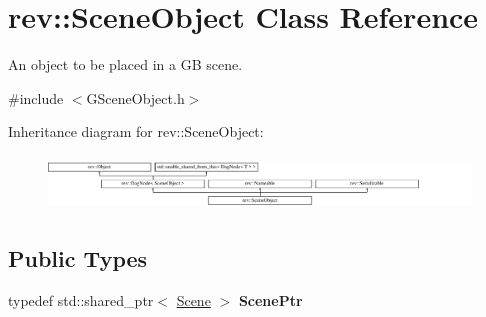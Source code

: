 \hypertarget{classrev_1_1_scene_object}{}\section{rev\+::Scene\+Object Class Reference}
\label{classrev_1_1_scene_object}


An object to be placed in a GB scene.  




{\ttfamily \#include $<$G\+Scene\+Object.\+h$>$}

Inheritance diagram for rev\+::Scene\+Object\+:\begin{figure}[H]
\begin{center}
\leavevmode
\includegraphics[height=1.438356cm]{classrev_1_1_scene_object}
\end{center}
\end{figure}
\subsection*{Public Types}
\begin{DoxyCompactItemize}
\item 
\mbox{\label{classrev_1_1_scene_object_a08a443f7f51adc2c2a70d396ef3031ae}} 
typedef std\+::shared\+\_\+ptr$<$ \mbox{\hyperlink{classrev_1_1_scene}{Scene}} $>$ {\bfseries Scene\+Ptr}
\end{DoxyCompactItemize}
